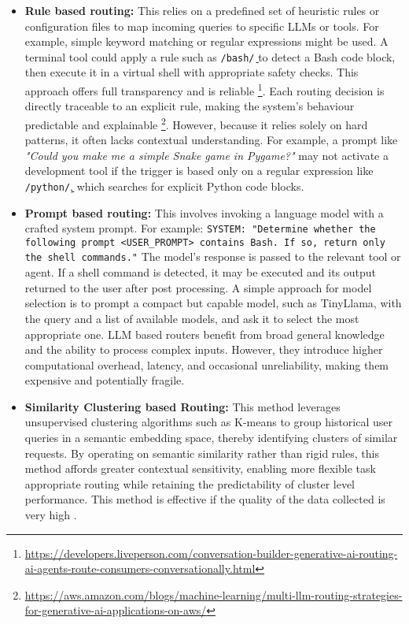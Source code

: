 \begin{itemize}
    \item \textbf{Rule based routing:} This relies on a predefined set of heuristic rules or configuration files to map incoming queries to specific LLMs or tools. For example, simple keyword matching or regular expressions might be used. A terminal tool could apply a rule such as \texttt{/bash\b/} to detect a Bash code block, then execute it in a virtual shell with appropriate safety checks. This approach offers full transparency and is reliable \footnote{\url{https://developers.liveperson.com/conversation-builder-generative-ai-routing-ai-agents-route-consumers-conversationally.html}}. Each routing decision is directly traceable to an explicit rule, making the system's behaviour predictable and explainable \footnote{\url{https://aws.amazon.com/blogs/machine-learning/multi-llm-routing-strategies-for-generative-ai-applications-on-aws/}}. However, because it relies solely on hard patterns, it often lacks contextual understanding. For example, a prompt like \textit{"Could you make me a simple Snake game in Pygame?"} may not activate a development tool if the trigger is based only on a regular expression like \texttt{/python\b/}, which searches for explicit Python code blocks.

    \item \textbf{Prompt based routing:} This involves invoking a language model with a crafted system prompt. For example: \texttt{SYSTEM: "Determine whether the following prompt <USER\_PROMPT> contains Bash. If so, return only the shell commands."} The model's response is passed to the relevant tool or agent. If a shell command is detected, it may be executed and its output returned to the user after post processing. A simple approach for model selection is to prompt a compact but capable model, such as TinyLlama, with the query and a list of available models, and ask it to select the most appropriate one. LLM based routers benefit from broad general knowledge and the ability to process complex inputs. However, they introduce higher computational overhead, latency, and occasional unreliability, making them expensive and potentially fragile.

    \item \textbf{Similarity Clustering based Routing:} This method leverages unsupervised clustering algorithms such as K-means to group historical user queries in a semantic embedding space, thereby identifying clusters of similar requests. By operating on semantic similarity rather than rigid rules, this method affords greater contextual sensitivity, enabling more flexible task appropriate routing while retaining the predictability of cluster level performance. This method is effective if the quality of the data collected is very high \cite{varangotreille2025doingimplementingrouting}.


\end{itemize}
